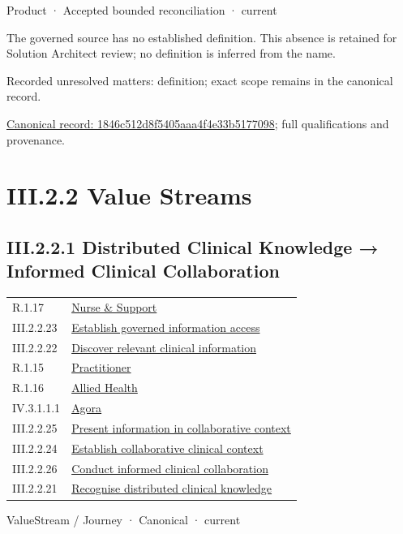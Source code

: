 \label{element:1846c512d8f5405aaa4f4e33b5177098}
{\small Product · Accepted bounded reconciliation · current}\par

The governed source has no established definition. This absence is retained for Solution Architect review; no definition is inferred from the name.


{\small Recorded unresolved matters: definition; exact scope remains in the canonical record.}\par
{\footnotesize \href{../../../../continuum/business/product/1846c512d8f5405aaa4f4e33b5177098.md}{Canonical record: 1846c512d8f5405aaa4f4e33b5177098}; full qualifications and provenance.}\par
\section*{III.2.2 Value Streams}
\label{navigation:III.2.2}

\subsection*{III.2.2.1 Distributed Clinical Knowledge → Informed Clinical Collaboration}
\label{navigation:III.2.2.1}

\begin{longtable}{p{.22\linewidth}p{.73\linewidth}}
R.1.17 & \hyperref[element:2498df8f930747fba52ef1a77b710156]{Nurse \& Support} \\
III.2.2.23 & \hyperref[element:26719186d6444b5b80029fbf13ae7d06]{Establish governed information access} \\
III.2.2.22 & \hyperref[element:413213f085b44715a309f39b55ee3ee6]{Discover relevant clinical information} \\
R.1.15 & \hyperref[element:49480591b4554983aaa82a79c1568bf3]{Practitioner} \\
R.1.16 & \hyperref[element:a5880a0af54c4797818caba31b813d19]{Allied Health} \\
IV.3.1.1.1 & \hyperref[element:d1c4053e68384080b8eb79d2008632ba]{Agora} \\
III.2.2.25 & \hyperref[element:e0a57481d1d343d48abc3357053576bb]{Present information in collaborative context} \\
III.2.2.24 & \hyperref[element:e453905e7aef4db2aba07de5efc932bc]{Establish collaborative clinical context} \\
III.2.2.26 & \hyperref[element:e53b13570f1945829b753d8d7b427fda]{Conduct informed clinical collaboration} \\
III.2.2.21 & \hyperref[element:fc1b52968e944710b41b2a7c3fa53e5b]{Recognise distributed clinical knowledge} \\
\end{longtable}
\label{element:3ba98c0c1170458f8c02fa76694fee67}
{\small ValueStream / Journey · Canonical · current}\par

